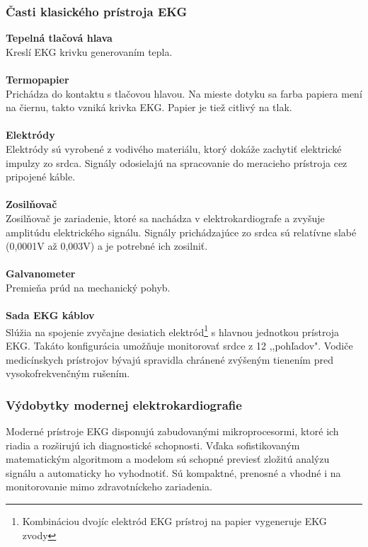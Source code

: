\documentclass[titlepage,12pt]{article}
\begin{document}
\newpage


\subsubsection{Časti klasického prístroja EKG}

\textbf{Tepelná tlačová hlava}
\\
Kreslí EKG krivku generovaním tepla.
\\
\\
\textbf{Termopapier}
\\
Prichádza do kontaktu s tlačovou hlavou. Na mieste dotyku sa farba papiera mení na čiernu, takto vzniká krivka EKG. Papier je tiež citlivý na tlak.
\\
\\
\textbf{Elektródy}
\\
Elektródy sú vyrobené z vodivého materiálu, ktorý dokáže zachytiť elektrické impulzy zo srdca. Signály odosielajú na spracovanie do meracieho prístroja cez pripojené káble.
\\
\\
\textbf{Zosilňovač}
\\
Zosilňovač je zariadenie, ktoré sa nachádza v elektrokardiografe a zvyšuje amplitúdu elektrického signálu. Signály prichádzajúce zo srdca sú relatívne slabé (0,0001V až 0,003V) a je potrebné ich zosilniť.
\\
\\
\textbf{Galvanometer}
\\
Premieňa prúd na mechanický pohyb.
\\
\\
\textbf{Sada EKG káblov}
\\
Slúžia na spojenie zvyčajne desiatich elektród\footnote{Kombináciou dvojíc elektród EKG prístroj na papier vygeneruje EKG zvody} s hlavnou jednotkou prístroja EKG. Takáto konfigurácia umožňuje monitorovať srdce z 12 ,,pohľadov". Vodiče medicínskych prístrojov bývajú spravidla chránené zvýšeným tienením pred vysokofrekvenčným rušením.

\subsubsection{Výdobytky modernej elektrokardiografie}
Moderné prístroje EKG disponujú zabudovanými mikroprocesormi, ktoré ich riadia a rozširujú ich diagnostické schopnosti. Vďaka sofistikovaným matematickým algoritmom a modelom sú schopné previesť zložitú analýzu signálu a automaticky ho vyhodnotiť. Sú kompaktné, prenosné a vhodné i na monitorovanie mimo zdravotníckeho zariadenia.
\end{document}
